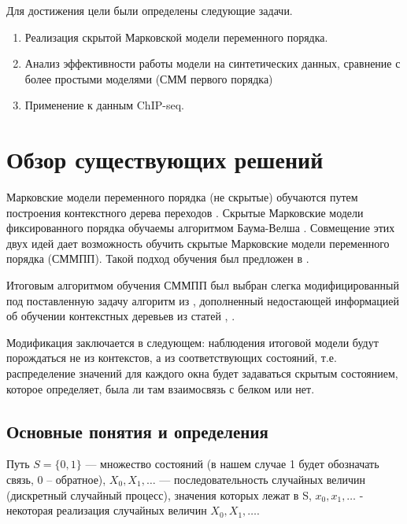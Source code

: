 \documentclass{matmex-diploma-custom}
\begin{document}
Для достижения цели были определены следующие задачи.
\begin{enumerate}
\item
Реализация скрытой Марковской модели
переменного порядка.
\item
Анализ эффективности работы модели на синтетических
данных, сравнение с более простыми моделями (СММ
первого порядка)
\item
Применение к данным ChIP-seq.
\end{enumerate}


\section{Обзор существующих решений}
Марковские модели переменного порядка (не скрытые) обучаются путем построения контекстного дерева переходов \cite{Buhlmann1999}. Скрытые Марковские модели фиксированного порядка обучаемы алгоритмом Баума-Велша \cite{Rabiner1989}.
Совмещение этих двух идей дает возможность обучить скрытые Марковские модели переменного порядка (СММПП). Такой подход обучения был предложен в \cite{Wang2006}. 

Итоговым алгоритмом обучения СММПП был выбран слегка модифицированный под поставленную задачу алгоритм  из \cite{Wang2006}, дополненный недостающей информацией об обучении контекстных деревьев из статей \cite{Buhlmann1999}, \cite{Dumont2014}.

Модификация заключается в следующем: наблюдения итоговой модели будут порождаться не из контекстов, а из соответствующих состояний, т.е. распределение значений для каждого окна будет задаваться скрытым состоянием, которое определяет, была ли там взаимосвязь с белком или нет. 

\subsection{Основные понятия и определения}

Путь 
$ S = \{0, 1\} $ --- множество состояний (в нашем случае 1 будет обозначать связь, 0 -- обратное), 
$X_0, X_1, \ldots $ --- последовательность случайных величин (дискретный случайный процесс), значения которых лежат в S, 
$x_0, x_1, \ldots$ - некоторая реализация случайных величин $X_0, X_1, \ldots $.
\end{document}
